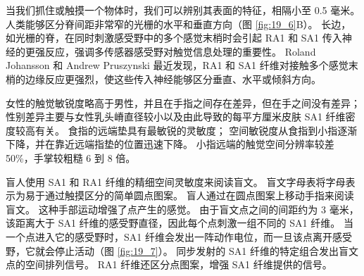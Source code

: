当我们抓住或触摸一个物体时，我们可以辨别其表面的特征，相隔小至 0.5 毫米。 
人类能够区分脊间距非常窄的光栅的水平和垂直方向（图 \ref{fig:19_6}B）。 
长边，如光栅的脊，在同时刺激感受野中的多个感觉末梢时会引起 RA1 和 SA1 传入神经的更强反应，强调多传感器感受野对触觉信息处理的重要性。 
Roland Johansson 和 Andrew Pruszynski 最近发现，RA1 和 SA1 纤维对接触多个感觉末梢的边缘反应更强烈，使这些传入神经能够区分垂直、水平或倾斜方向。


女性的触觉敏锐度略高于男性，并且在手指之间存在差异，但在手之间没有差异； 
性别差异主要与女性乳头嵴直径较小以及由此导致的每平方厘米皮肤 SA1 纤维密度较高有关。 
食指的远端垫具有最敏锐的灵敏度； 空间敏锐度从食指到小指逐渐下降，并在靠近远端指垫的位置迅速下降。 
小指远端的触觉空间分辨率较差 50\%，手掌较粗糙 6 到 8 倍。


盲人使用 SA1 和 RA1 纤维的精细空间灵敏度来阅读盲文。 
盲文字母表将字母表示为易于通过触摸区分的简单圆点图案。 
盲人通过在圆点图案上移动手指来阅读盲文。 
这种手部运动增强了点产生的感觉。 
由于盲文点之间的间距约为 3 毫米，该距离大于 SA1 纤维的感受野直径，因此每个点刺激一组不同的 SA1 纤维。 
当一个点进入它的感受野时，SA1 纤维会发出一阵动作电位，而一旦该点离开感受野，它就会停止活动（图 \ref{fig:19_7}）。 
同步发射的 SA1 纤维的特定组合发出盲文点的空间排列信号。 
RA1 纤维还区分点图案，增强 SA1 纤维提供的信号。

